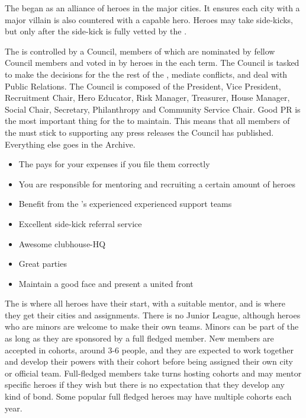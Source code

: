 \documentclass[blue]{LRSguildcamp1}
\begin{document}
\name{\bHeroLeague{}}


The \cHeroLeague{\intro} began as an alliance of heroes in the major cities. It ensures each city with a major villain is also countered with a capable hero. Heroes may take side-kicks, but only after the side-kick is fully vetted by the \cHeroLeague{}. 

The \cHeroLeague{} is controlled by a Council, members of which are nominated by fellow Council members and voted in by heroes in the \cHeroLeague{} each term. The Council is tasked to make the decisions for the the rest of the \cHeroLeague{}, mediate conflicts, and deal with Public Relations. The Council is composed of the President, Vice President, Recruitment Chair, Hero Educator, Risk Manager, Treasurer, House Manager, Social Chair, Secretary, Philanthropy and Community Service Chair. Good PR is the most important thing for the \cHeroLeague{} to maintain. This means that all members of the \cHeroLeague{} must stick to supporting any press releases the Council has published. Everything else goes in the \cHeroLeague{} Archive.

\begin{itemize}
\item The \cHeroLeague{} pays for your expenses if you file them correctly 
\item You are responsible for mentoring and recruiting a certain amount of heroes
\item Benefit from the \cHeroLeague{}'s experienced experienced support teams
\item Excellent side-kick referral service 
\item Awesome clubhouse-HQ
\item Great parties
\item Maintain a good face and present a united front
\end{itemize}

The \cHeroLeague{} is where all heroes have their start, with a suitable mentor, and is where they get their cities and assignments. There is no Junior League, although heroes who are minors are welcome to make their own teams. Minors can be part of the \cHeroLeague{} as long as they are sponsored by a full fledged member. New members are accepted in cohorts, around 3-6 people, and they are expected to work together and develop their powers with their cohort before being assigned their own city or official team. Full-fledged members take turns hosting cohorts and may mentor specific heroes if they wish but there is no expectation that they develop any kind of bond. Some popular full fledged heroes may have multiple cohorts each year.  
\end{document}
